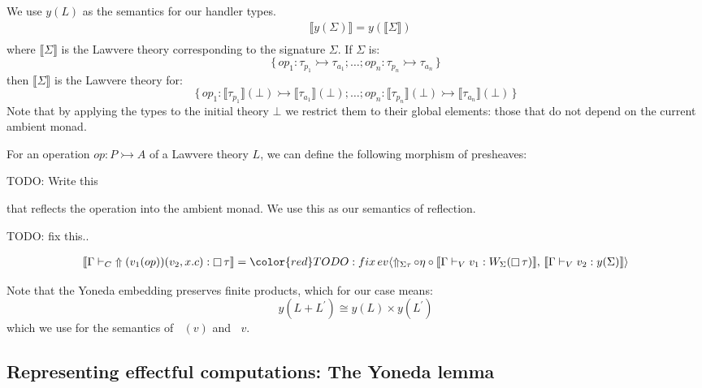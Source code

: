 \documentclass[acmsmall, screen, nonacm]{acmart}
\theoremstyle{definition}
\newcommand{\glob}{\mathop{\Box}}
\newcommand{\initial}{\bot}
\newcommand{\yoneda}[1]{y(#1)}
\newcommand{\sem}[1]{\llbracket #1 \rrbracket}
\newcommand{\reflectname}{\Uparrow}
\newcommand{\reflectc}[2]{\mathop{\reflectname_{#1 #2}}}
\newcommand{\performraw}[2]{\mathop{\reflectname(#1(#2))}}
\newcommand{\perform}[5]{\performraw{#1}{#2}(#3, #4. #5)}
\newcommand{\outl}[1]{\mathop{\mathrm{out}_L} #1}
\newcommand{\outr}[1]{\mathop{\mathrm{out}_R} #1}
\newcommand{\ind}[1]{W_{#1}}
\newcommand{\types}{\mathrel{:}}
\newcommand{\turnv}{\mathrel{\vdash_V}}
\newcommand{\turnc}{\mathrel{\vdash_C}}
\newcommand{\evmap}{\mathop{ev}}
\newcommand{\todo}[1]{{\color{red}TODO: #1}}
\begin{document}
We use $\yoneda{L}$ as the semantics for our handler types.
\begin{align*}
&\sem{\yoneda{\Sigma}} = \yoneda{\sem{\Sigma}}\\
\end{align*}
where $\sem{\Sigma}$ is the Lawvere theory corresponding to the
signature $\Sigma$. If $\Sigma$ is:
\begin{equation*}
\{ \, op_1 \types \tau_{p_1} \rightarrowtail \tau_{a_1}; \ldots; op_n
\types \tau_{p_n} \rightarrowtail \tau_{a_n} \, \}
\end{equation*}
then $\sem{\Sigma}$ is the Lawvere theory for:
\begin{equation*}
\{ \, op_1 \types \sem{\tau_{p_1}}(\initial) \rightarrowtail \sem{\tau_{a_1}}(\initial); \ldots; op_n
\types \sem{\tau_{p_n}}(\initial) \rightarrowtail \sem{\tau_{a_n}}(\initial) \, \}
\end{equation*}
Note that by applying the types to the initial theory $\initial$ we
restrict them to their global elements: those that do not depend on the
current ambient monad.

For an operation $op \types P \rightarrowtail A$ of a Lawvere theory
$L$, we can define the following morphism of presheaves:

\todo{Write this}

that reflects the operation into the ambient monad. We use this as our
semantics of reflection.

\todo{fix this..}

\begin{align*}
&\sem{\Gamma \turnc \perform{v_1}{op}{v_2}{x}{c} \types \glob \tau} = \todo{fix}
  \evmap \langle \reflectc{\Sigma}{\tau} \circ \eta \circ
                   \sem{\Gamma \turnv v_1 \types \ind{\Sigma}(\glob \tau)},\,
                 \sem{\Gamma \turnv v_2 \types \yoneda{\Sigma}} \rangle \\
\end{align*}

Note that the Yoneda embedding preserves finite products, which for our
case means:
\begin{equation*}
\yoneda{L + L^{\prime}} \cong \yoneda{L} \times \yoneda{L^{\prime}}
\end{equation*}
which we use for the semantics of $\outl(v)$ and $\outr{v}$.

\subsection{Representing effectful computations: The Yoneda lemma}
\end{document}
